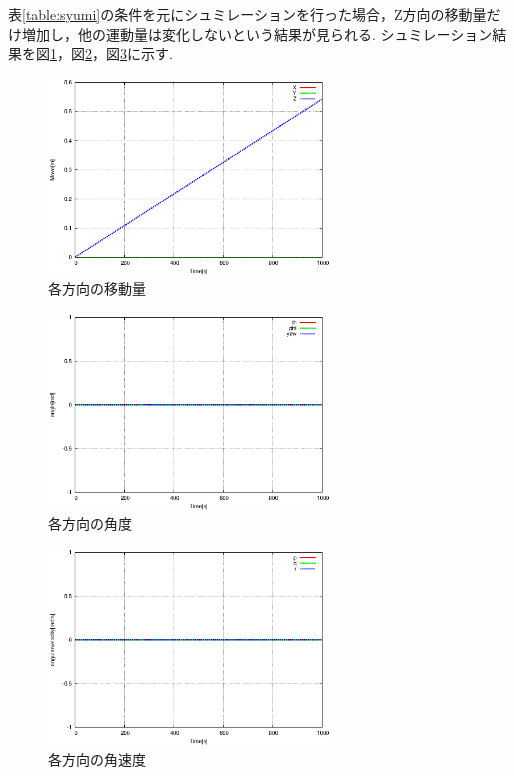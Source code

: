 \documentclass[12pt,oneside]{sotsuken_paper}
\begin{document}
表\ref{table:syumi}の条件を元にシュミレーションを行った場合，Z方向の移動量だけ増加し，他の運動量は変化しないという結果が見られる.
シュミレーション結果を図\ref{fig:UVW}，図\ref{fig:tpy}，図\ref{fig:XYZ}に示す.

\begin{figure}[htbp]
	\begin{center}
		\includegraphics[width=75mm]{image/simulation/UVW.eps}
		\caption{各方向の移動量}
		\label{fig:UVW}
	\end{center}
\end{figure}

\begin{figure}[htbp]
	\begin{center}
		\includegraphics[width=75mm]{image/simulation/tpy.eps}
		\caption{各方向の角度}
		\label{fig:tpy}
	\end{center}
\end{figure}

\begin{figure}[htbp]
	\begin{center}
		\includegraphics[width=75mm]{image/simulation/XYZ.eps}
		\caption{各方向の角速度}
		\label{fig:XYZ}
	\end{center}
\end{figure}
\end{document}
